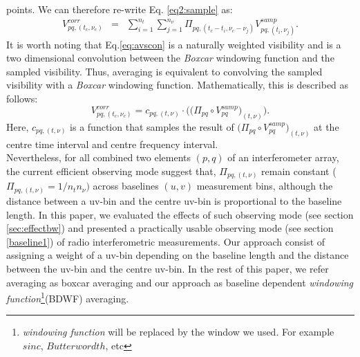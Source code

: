 \documentclass[useAMS,usenatbib]{mn2e}
\begin{document}
points. We can therefore re-write Eq. \ref{eq2:sample} as:
\begin{eqnarray}
V_{pq,(t_c,\nu_c)}^{corr}&=&\sum_{i=1}^{n_t}\sum_{j=1}^{n_{\nu}}\Pi_{pq,(t_c - t_i,\nu_c -\nu_j)}V_{pq,(t_i,\nu_j)}^{samp}. 
\label{eq:avscon}
\end{eqnarray}
It is worth noting that Eq.\ref{eq:avscon} is a naturally weighted visibility and is a two dimensional convolution between the 
\textit{Boxcar} windowing function and the sampled visibility. Thus, averaging is equivalent to convolving the 
sampled 
visibility with a \textit{Boxcar} windowing function. Mathematically, this is described as follows:
\begin{equation}
 V_{pq,(t_c,\nu_c)}^{corr}=c_{pq,(t,\nu)}\cdot\Bigg(\Big(\Pi_{pq}\circ V_{pq}^{samp}\Big)_{(t,\nu)}\Bigg). \label{f4}
\end{equation}
Here, $c_{pq,(t,\nu)}$ is a function that samples the result of $\Big(\Pi_{pq}\circ V_{pq}^{samp}\Big)_{(t,\nu)}$ at 
the centre time interval and centre frequency interval. 
\\%
Nevertheless, for all combined two elements $(p,q)$ of an interferometer array, the current efficient observing mode suggest that, 
$\Pi_{pq,(t,\nu)}$ remain constant ($\Pi_{pq,(t,\nu)}=1/n_t n_{\nu})$ across baselines $(u,v)$ measurement bins, although the distance 
between a uv-bin and the centre uv-bin is proportional to the baseline length. In this paper, we evaluated the
effects of such observing mode (see section \ref{sec:effectbw}) and presented a practically usable
observing mode (see section \ref{baseline1}) of 
radio interferometric measurements. Our approach consist of assigning a weight of a uv-bin depending on the baseline 
length and the distance between the uv-bin and the centre uv-bin. In the rest of this paper, we refer averaging as boxcar 
averaging and our approach as baseline dependent \textit{windowing function}\footnote{\textit{windowing function} will be replaced by the 
window we used. For example $sinc$, $Butterwordth$, etc}(BDWF) averaging.
\end{document}
